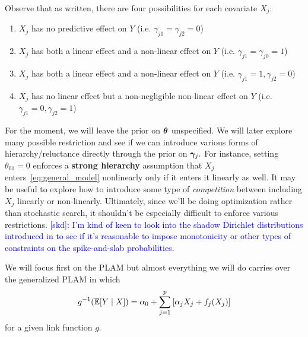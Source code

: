 \begin{remark}
Observe that as written, there are four possibilities for each covariate $X_{j}$:
\begin{enumerate}
\item{$X_{j}$ has no predictive effect on $Y$ (i.e. $\gamma_{j1} = \gamma_{j2} = 0$)}
\item{$X_{j}$ has both a linear effect and a non-linear effect on $Y$ (i.e. $\gamma_{j1} = \gamma_{j0} = 1$)}
\item{$X_{j}$ has both a linear effect and a non-linear effect on $Y$ (i.e. $\gamma_{j1} = 1, \gamma_{j2} = 0$)}
\item{$X_{j}$ has no linear effect but a non-negligible non-linear effect on $Y$ (i.e. $\gamma_{j1} = 0, \gamma_{j2} =  1$)}
\end{enumerate}
For the moment, we will leave the prior on $\boldsymbol{\theta}$ unspecified.
We will later explore many possible restriction and see if we can introduce various forms of hierarchy/reluctance directly through the prior on $\boldsymbol{\gamma}_{j}.$
For instance, setting $\theta_{01} = 0$ enforces a \textbf{strong hierarchy} assumption that $X_{j}$ enters~\eqref{eq:general_model} nonlinearly only if it enters it linearly as well.
It may be useful to explore how to introduce some type of \textit{competition} between including $X_{j}$ linearly or non-linearly.
Ultimately, since we'll be doing optimization rather than stochastic search, it shouldn't be especially difficult to enforce various restrictions.
\textcolor{blue}{[skd]: I'm kind of keen to look into the shadow Dirichlet distributions introduced in \citet{Frigyik2010} to see if it's reasonable to impose monotonicity or other types of constraints on the spike-and-slab probabilities.}
\end{remark}


\begin{remark}
We will focus first on the PLAM but almost everything we will do carries over the generalized PLAM in which
$$
g^{-1}(\mathbb{E}[Y \mid X]) = \alpha_{0} + \sum_{j = 1}^{p}{[\alpha_{j}X_{j} + f_{j}(X_{j})]}
$$
for a given link function $g.$
\end{remark}



\begin{comment}
\begin{align*}
p(\bgamma_{j} \mid \theta_{0}, \theta_{1}, \theta_{2}) \propto [\theta_{0}\theta_{1}^{\gamma_{j2}}(1 - \theta_{1})^{1-\gamma_{j2}}]^{\gamma_{j1}}[(1 - \theta_{0})\theta_{2}^{\gamma_{j2}}(1 - \theta_{2})^{1-\gamma_{j2}}]^{\gamma_{j1}} \\
p(\theta_{0}, \theta_{1}, \theta_{2}) &\propto \prod_{k = 0}^{2}{\theta_{k}^{a_{k} -1}(1 - \theta_{k})^{b_{k} - 1}} \\
p(\sigma^{2}) &\propto (\sigma^{2})^{-\frac{\nu}{2}}\exp\{-\frac{\nu\lambda}{2\sigma^{2}}\}.
\end{align*}
where $a_{k}, b_{k} > 0$ are positive constants for $k = 0, 1, 2$ and $\nu, \lambda > 0$ are fixed positive constants.
\end{comment} 
